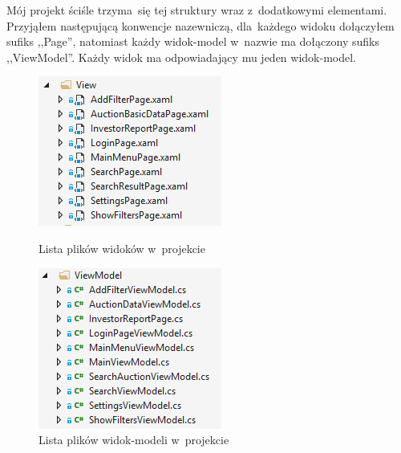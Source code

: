 \documentclass[a4paper,twoside,titlepage,openright]{book}
\begin{document}
Mój projekt ściśle trzyma~się tej struktury wraz z~dodatkowymi elementami. Przyjąłem następującą konwencje nazewniczą, dla~każdego widoku dołączyłem sufiks ,,Page'', natomiast każdy widok-model w~nazwie ma dołączony sufiks ,,ViewModel''. Każdy widok ma odpowiadający mu jeden widok-model. 


\begin{figure}[h]
	\centering
	\begin{minipage}[h]{0.33\textwidth}
		\includegraphics[width=\textwidth]{listawidokow.png}
		\caption{Lista plików widoków w~projekcie}
	\end{minipage}
\hspace*{60px}
	\begin{minipage}[h]{0.33\textwidth}
		\includegraphics[width=\textwidth]{listaviewmodeli.png}
		\caption{Lista plików widok-modeli w~projekcie}
	\end{minipage}
	\hfill
\end{figure}
\end{document}

